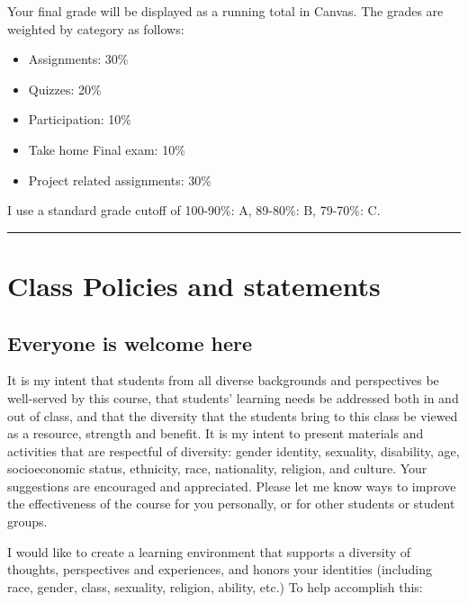 \documentclass[
  letterpaper,
  DIV=11,
  numbers=noendperiod]{scrartcl}
\providecommand{\tightlist}{%
  \setlength{\itemsep}{0pt}\setlength{\parskip}{0pt}}\usepackage{longtable,booktabs,array}
\begin{document}
Your final grade will be displayed as a running total in Canvas. The
grades are weighted by category as follows:

\begin{itemize}
\tightlist
\item
  Assignments: 30\%
\item
  Quizzes: 20\%
\item
  Participation: 10\%\\
\item
  Take home Final exam: 10\%
\item
  Project related assignments: 30\%
\end{itemize}

I use a standard grade cutoff of 100-90\%: A, 89-80\%: B, 79-70\%: C.

\begin{center}\rule{0.5\linewidth}{0.5pt}\end{center}

\hypertarget{class-policies-and-statements}{%
\section{Class Policies and
statements}\label{class-policies-and-statements}}

\hypertarget{everyone-is-welcome-here}{%
\subsection{Everyone is welcome here}\label{everyone-is-welcome-here}}

It is my intent that students from all diverse backgrounds and
perspectives be well-served by this course, that students' learning
needs be addressed both in and out of class, and that the diversity that
the students bring to this class be viewed as a resource, strength and
benefit. It is my intent to present materials and activities that are
respectful of diversity: gender identity, sexuality, disability, age,
socioeconomic status, ethnicity, race, nationality, religion, and
culture. Your suggestions are encouraged and appreciated. Please let me
know ways to improve the effectiveness of the course for you personally,
or for other students or student groups.

I would like to create a learning environment that supports a diversity
of thoughts, perspectives and experiences, and honors your identities
(including race, gender, class, sexuality, religion, ability, etc.) To
help accomplish this:
\end{document}
